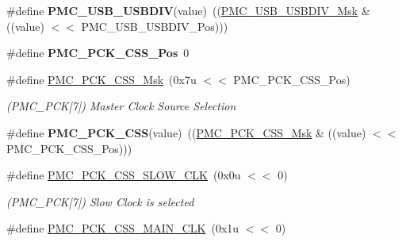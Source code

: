 \begin{DoxyCompactItemize}
\mbox{\label{group__SAME70__PMC_ga3cfa88f5a6b2b7603b3edf9672e5a7f3}} 
\#define {\bfseries P\+M\+C\+\_\+\+U\+S\+B\+\_\+\+U\+S\+B\+D\+IV}(value)~((\mbox{\hyperlink{group__SAMV71__PMC_gabb062c3f15ab096e8ea86a30d4ba7293}{P\+M\+C\+\_\+\+U\+S\+B\+\_\+\+U\+S\+B\+D\+I\+V\+\_\+\+Msk}} \& ((value) $<$$<$ P\+M\+C\+\_\+\+U\+S\+B\+\_\+\+U\+S\+B\+D\+I\+V\+\_\+\+Pos)))
\item 
\mbox{\label{group__SAME70__PMC_gaeb2591f58195c0810f323ea1da2ea7cc}} 
\#define {\bfseries P\+M\+C\+\_\+\+P\+C\+K\+\_\+\+C\+S\+S\+\_\+\+Pos}~0
\item 
\mbox{\label{group__SAME70__PMC_ga674cfaca042723467fab0808cc17fa46}} 
\#define \mbox{\hyperlink{group__SAME70__PMC_ga674cfaca042723467fab0808cc17fa46}{P\+M\+C\+\_\+\+P\+C\+K\+\_\+\+C\+S\+S\+\_\+\+Msk}}~(0x7u $<$$<$ P\+M\+C\+\_\+\+P\+C\+K\+\_\+\+C\+S\+S\+\_\+\+Pos)
\begin{DoxyCompactList}\small\item\em (P\+M\+C\+\_\+\+P\+CK\mbox{[}7\mbox{]}) Master Clock Source Selection \end{DoxyCompactList}\item 
\mbox{\label{group__SAME70__PMC_ga63684d30fb828b6081a7c39cb034f652}} 
\#define {\bfseries P\+M\+C\+\_\+\+P\+C\+K\+\_\+\+C\+SS}(value)~((\mbox{\hyperlink{group__SAMV71__PMC_ga674cfaca042723467fab0808cc17fa46}{P\+M\+C\+\_\+\+P\+C\+K\+\_\+\+C\+S\+S\+\_\+\+Msk}} \& ((value) $<$$<$ P\+M\+C\+\_\+\+P\+C\+K\+\_\+\+C\+S\+S\+\_\+\+Pos)))
\item 
\mbox{\label{group__SAME70__PMC_ga82909c82066c3acdf728698a4136265c}} 
\#define \mbox{\hyperlink{group__SAME70__PMC_ga82909c82066c3acdf728698a4136265c}{P\+M\+C\+\_\+\+P\+C\+K\+\_\+\+C\+S\+S\+\_\+\+S\+L\+O\+W\+\_\+\+C\+LK}}~(0x0u $<$$<$ 0)
\begin{DoxyCompactList}\small\item\em (P\+M\+C\+\_\+\+P\+CK\mbox{[}7\mbox{]}) Slow Clock is selected \end{DoxyCompactList}\item 
\mbox{\label{group__SAME70__PMC_ga9d28f7ac2092e8157abf6e51a2b4dd8d}} 
\#define \mbox{\hyperlink{group__SAME70__PMC_ga9d28f7ac2092e8157abf6e51a2b4dd8d}{P\+M\+C\+\_\+\+P\+C\+K\+\_\+\+C\+S\+S\+\_\+\+M\+A\+I\+N\+\_\+\+C\+LK}}~(0x1u $<$$<$ 0)
$$
\end{DoxyCompactItemize}
